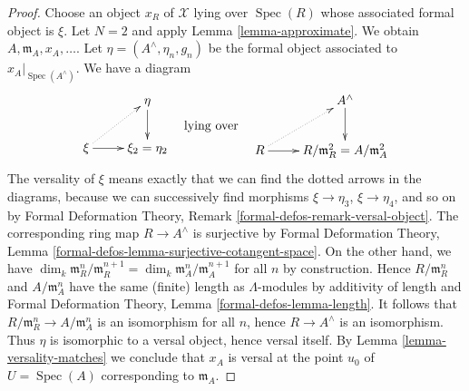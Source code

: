 \documentclass[10pt,a4paper]{amsart}
\theoremstyle{plain}
\theoremstyle{definition}
\theoremstyle{remark}
\numberwithin{equation}{subsection}
\def\Spec{\mathop{\mathrm{Spec}}}
\begin{document}
\begin{proof}
Choose an object $x_R$ of $\mathcal{X}$ lying over $\Spec(R)$ whose associated
formal object is $\xi$. Let $N = 2$ and apply Lemma \ref{lemma-approximate}.
We obtain $A, \mathfrak m_A, x_A, \ldots$.
Let $\eta = (A^\wedge, \eta_n, g_n)$ be the formal object associated to
$x_A|_{\Spec(A^\wedge)}$. We have a diagram
$$
\vcenter{
\xymatrix{
& \eta \ar[d] \\
\xi \ar[r] \ar@{..>}[ru] & \xi_2 = \eta_2
}
}
\quad\text{lying over}\quad
\vcenter{
\xymatrix{
& A^\wedge \ar[d] \\
R \ar[r] \ar@{..>}[ru] & R/\mathfrak m_R^2 = A/\mathfrak m_A^2
}
}
$$
The versality of $\xi$ means exactly that we can find the
dotted arrows in the diagrams, because we can successively find
morphisms $\xi \to \eta_3$, $\xi \to \eta_4$, and so on by
Formal Deformation Theory, Remark \ref{formal-defos-remark-versal-object}.
The corresponding ring map $R \to A^\wedge$ is surjective by
Formal Deformation Theory, Lemma
\ref{formal-defos-lemma-surjective-cotangent-space}.
On the other hand, we have
$\dim_k \mathfrak m_R^n/\mathfrak m_R^{n + 1} =
\dim_k \mathfrak m_A^n/\mathfrak m_A^{n + 1}$ for all $n$ by construction.
Hence $R/\mathfrak m_R^n$ and $A/\mathfrak m_A^n$ have the same (finite)
length as $\Lambda$-modules by additivity of length and
Formal Deformation Theory, Lemma \ref{formal-defos-lemma-length}.
It follows that $R/\mathfrak m_R^n \to A/\mathfrak m_A^n$ is an isomorphism
for all $n$, hence $R \to A^\wedge$ is an isomorphism. Thus $\eta$ is
isomorphic to a versal object, hence versal itself. By
Lemma \ref{lemma-versality-matches}
we conclude that $x_A$ is versal at the point $u_0$ of
$U = \Spec(A)$ corresponding to $\mathfrak m_A$.
\end{proof}
\end{document}
